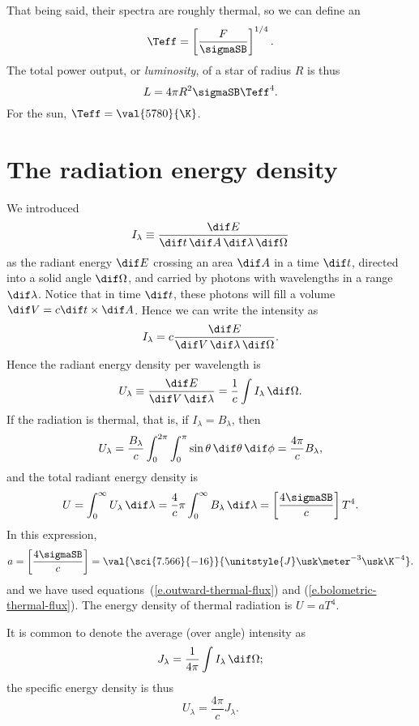  That being said, their spectra are roughly thermal, so we can define an 
\[	\Teff = \left[\frac{F}{\sigmaSB}\right]^{1/4}. \]
The total power output, or \emph{luminosity}, of a star of radius $R$ is thus
\[
	L = 4\pi R^{2}\sigmaSB \Teff^{4}.
\]
For the sun, $\Teff = \val{5780}{\K}$.


\section{The radiation energy density}\label{s.radiation-energy-density}

We introduced
\[
I_{\lambda} \equiv \frac{\dif E}{\dif t\,\dif A\,\dif\lambda\,\dif\Omega}
\]
as the radiant energy $\dif E$ crossing an area $\dif A$ in a time $\dif t$, directed into a solid angle $\dif\Omega$, and carried by photons with wavelengths in a range $\dif\lambda$. Notice that in time $\dif t$, these photons will fill a volume $\dif V = c\dif t\times \dif A$. Hence we can write the intensity as
\[
I_{\lambda} = c\frac{\dif E}{\dif V\,\dif \lambda\,\dif\Omega}.
\]
Hence the radiant energy density per wavelength is
\begin{equation}
	U_{\lambda} \equiv \frac{\dif E}{\dif V\,\dif\lambda} = \frac{1}{c}\int I_{\lambda}\,\dif \Omega.
\end{equation}
If the radiation is thermal, that is, if $I_{\lambda} = B_{\lambda}$, then
\[
U_{\lambda} = \frac{B_{\lambda}}{c}\int_{0}^{2\pi}\int_{0}^{\pi}\sin\theta\,\dif\theta\,\dif\phi = \frac{4\pi}{c}B_{\lambda},
\]
and the total radiant energy density is
\[
U = \int_{0}^{\infty}U_{\lambda}\,\dif\lambda = \frac{4}{c}\pi\int_{0}^{\infty}B_{\lambda}\,\dif\lambda = \left[\frac{4\sigmaSB}{c}\right] T^{4}.
\]
In this expression, 
\[ 
a = \left[\frac{4\sigmaSB}{c}\right] = \val{\sci{7.566}{-16}}{\unitstyle{J}\usk\meter^{-3}\usk\K^{-4}}.
\]
and we have used equations~(\ref{e.outward-thermal-flux}) and (\ref{e.bolometric-thermal-flux}). The energy density of thermal radiation is $U = aT^{4}$.

It is common to denote the average (over angle) intensity as
\begin{equation}\label{e.angle-average-intensity}
J_{\lambda} = \frac{1}{4\pi}\int I_{\lambda}\,\dif\Omega;
\end{equation}
the specific energy density is thus
\[ U_{\lambda} = \frac{4\pi}{c}J_{\lambda}. \]

